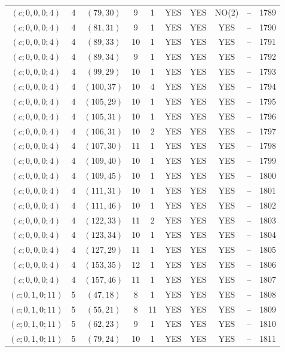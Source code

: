 \begin{longtable}{|c|c|c|c|c|c|c|c|c|c|}
$(c; 0, 0, 0; 4)$ & 4 & $(79, 30)$ & 9 & 1 & YES & YES & NO(2) & -- & 1789\\
$(c; 0, 0, 0; 4)$ & 4 & $(81, 31)$ & 9 & 1 & YES & YES & YES & -- & 1790\\
$(c; 0, 0, 0; 4)$ & 4 & $(89, 33)$ & 10 & 1 & YES & YES & YES & -- & 1791\\
$(c; 0, 0, 0; 4)$ & 4 & $(89, 34)$ & 9 & 1 & YES & YES & YES & -- & 1792\\
$(c; 0, 0, 0; 4)$ & 4 & $(99, 29)$ & 10 & 1 & YES & YES & YES & -- & 1793\\
$(c; 0, 0, 0; 4)$ & 4 & $(100, 37)$ & 10 & 4 & YES & YES & YES & -- & 1794\\
$(c; 0, 0, 0; 4)$ & 4 & $(105, 29)$ & 10 & 1 & YES & YES & YES & -- & 1795\\
$(c; 0, 0, 0; 4)$ & 4 & $(105, 31)$ & 10 & 1 & YES & YES & YES & -- & 1796\\
$(c; 0, 0, 0; 4)$ & 4 & $(106, 31)$ & 10 & 2 & YES & YES & YES & -- & 1797\\
$(c; 0, 0, 0; 4)$ & 4 & $(107, 30)$ & 11 & 1 & YES & YES & YES & -- & 1798\\
$(c; 0, 0, 0; 4)$ & 4 & $(109, 40)$ & 10 & 1 & YES & YES & YES & -- & 1799\\
$(c; 0, 0, 0; 4)$ & 4 & $(109, 45)$ & 10 & 1 & YES & YES & YES & -- & 1800\\
$(c; 0, 0, 0; 4)$ & 4 & $(111, 31)$ & 10 & 1 & YES & YES & YES & -- & 1801\\
$(c; 0, 0, 0; 4)$ & 4 & $(111, 46)$ & 10 & 1 & YES & YES & YES & -- & 1802\\
$(c; 0, 0, 0; 4)$ & 4 & $(122, 33)$ & 11 & 2 & YES & YES & YES & -- & 1803\\
$(c; 0, 0, 0; 4)$ & 4 & $(123, 34)$ & 10 & 1 & YES & YES & YES & -- & 1804\\
$(c; 0, 0, 0; 4)$ & 4 & $(127, 29)$ & 11 & 1 & YES & YES & YES & -- & 1805\\
$(c; 0, 0, 0; 4)$ & 4 & $(153, 35)$ & 12 & 1 & YES & YES & YES & -- & 1806\\
$(c; 0, 0, 0; 4)$ & 4 & $(157, 46)$ & 11 & 1 & YES & YES & YES & -- & 1807\\
$(c; 0, 1, 0; 11)$ & 5 & $(47, 18)$ & 8 & 1 & YES & YES & YES & -- & 1808\\
$(c; 0, 1, 0; 11)$ & 5 & $(55, 21)$ & 8 & 11 & YES & YES & YES & -- & 1809\\
$(c; 0, 1, 0; 11)$ & 5 & $(62, 23)$ & 9 & 1 & YES & YES & YES & -- & 1810\\
$(c; 0, 1, 0; 11)$ & 5 & $(79, 24)$ & 10 & 1 & YES & YES & YES & -- & 1811\\

\end{longtable}
